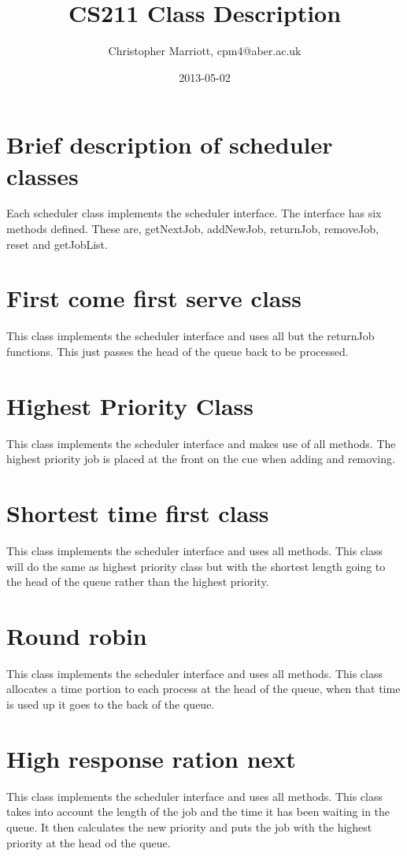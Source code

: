 \documentclass{article}
\title{CS211 Class Description}
\date{2013-05-02}
\author{Christopher Marriott, cpm4@aber.ac.uk}
\begin{document}
\maketitle
\newpage
\tableofcontents
\newpage

\section{Brief description of scheduler classes}
Each scheduler class implements the scheduler interface. The interface has six methods defined. These are, getNextJob, addNewJob, returnJob, removeJob, reset and getJobList. 

\section{First come first serve class}
This class implements the scheduler interface and uses all but the returnJob functions. This just passes the head of the queue back to be processed.

\section{Highest Priority Class}
This class implements the scheduler interface and makes use of all methods. The highest priority job is placed at the front on the cue when adding and removing.

\section{Shortest time first class}
This class implements the scheduler interface and uses all methods. This class will do the same as highest priority class but with the shortest length going to the head of the queue rather than the highest priority.

\section{Round robin}
This class implements the scheduler interface and uses all methods. This class allocates a time portion to each process at the head of the queue, when that time is used up it goes to the back of the queue.

\section{High response ration next}
This class implements the scheduler interface and uses all methods. This class takes into account the length of the job and the time it has been waiting in the queue. It then calculates the new priority and puts the job with the highest priority at the head od the queue.
\end{document}

